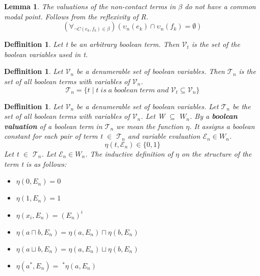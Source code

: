 \documentclass{article}
\newcommand\V{\mathcal{V}}
\newcommand\E{\mathcal{E}}
\newcommand\Tn{\mathcal{T}_n}
\newtheorem{lemma}[theorem]{Lemma}
\newtheorem{defn}[theorem]{Deffinition}
\begin{document}
		\begin{lemma}
			The valuations of the non-contact terms in $\beta$ do not have a common modal point. Follows from the reflexivity of R.
			\begin{equation}
				(\forall_{\neg C(e_k, f_k) \in \beta})(\upsilon_n(e_k) \cap \upsilon_n(f_k) = \emptyset)
			\end{equation}
		\end{lemma}

		\begin{defn}
			Let t be an arbitrary boolean term. Then $\V_t$ is the set of the boolean variables used in t.
		\end{defn}

		\begin{defn}
			Let $\V_n$ be a denumerable set of boolean variables. Then $\Tn$ is the set of all boolean terms with variables of $\V_n$.
			\begin{equation}
				\Tn = \{t \mid t \;is\; a \;boolean \;term \;and \;\V_t \subseteq \V_n \}
			\end{equation}
		\end{defn}

		\begin{defn}
			\label{boolean-valuation}
			Let $\V_n$ be a denumerable set of boolean variables. Let $\Tn$ be the set of all boolean terms with variables of $\V_n$. Let W $\subseteq$ $W_n$. By a \textbf{boolean valuation} of a boolean term in $\Tn$ we mean the function $\eta$. It assigns a boolean constant for each pair of term t $\in$ $\Tn$ and variable evaluation $\E_n \in W_n$.
			\begin{equation}
				\eta(t, \E_n) \in \{0, 1\}
			\end{equation}
			Let t $\in$ $\Tn$. Let $\E_n \in W_n$. The inductive definition of $\eta$ on the structure of the term t is as follows:
			\begin{itemize}
				\item $\eta(0, E_n) = 0$
				\item $\eta(1, E_n) = 1$
				\item $\eta(x_i, E_n) = (E_n)^i$		
				\item $\eta(a \sqcap b, E_n) = \eta(a, E_n) \sqcap \eta(b, E_n)$
				\item $\eta(a \sqcup b, E_n) = \eta(a, E_n) \sqcup \eta(b, E_n)$
				\item $\eta(a^*, E_n) = \;^*\eta(a, E_n)$
			\end{itemize}
		\end{defn}
\end{document}
